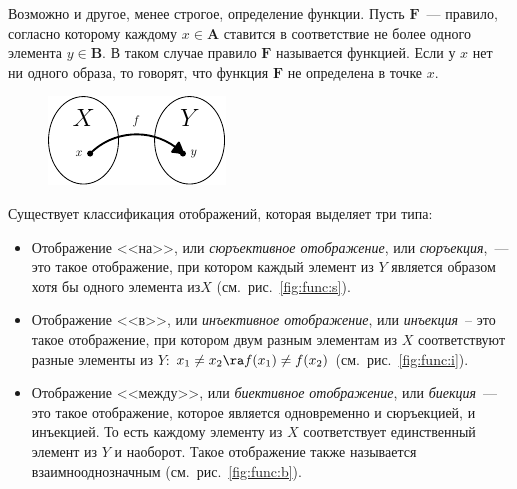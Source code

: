 Возможно и другое, менее строгое, определение функции. Пусть $\mathbf F$~--- правило, согласно которому каждому $x\in\mathbf A$ ставится в соответствие не более одного элемента $y\in\mathbf B$. В таком случае правило $\mathbf F$ называется функцией. Если у $x$ нет ни одного образа, то говорят, что функция $\mathbf F$ не определена в точке $x$.

\begin{figure}
	\vspace{-.33cm}
	\includegraphics{graph/mapping-def}
\end{figure}

Существует классификация отображений, которая выделяет три типа:

\begin{itemize}
	\item{}
		Отображение <<на>>, или \emph{сюръективное отображение}, или
		\emph{сюръекция},~--- это такое отображение, при котором каждый элемент из $Y$
		является образом хотя бы одного элемента из\newline $X$ (см.~рис.~\ref{fig:func:s}).
	\item{}
		Отображение <<в>>, или \emph{инъективное отображение}, или \emph{инъекция}~--
		это такое отображение, при котором двум разным элементам из $X$ соответствуют
		разные элементы из $Y$: $x_1\ne x_2 \ra f(x_1)\ne f(x_2)$ (см.~рис.~\ref{fig:func:i}).
	\item{}
		Отображение <<между>>, или \emph{биективное отображение}, или \emph{биекция}~---
		это такое отображение, которое является одновременно и сюръекцией, и инъекцией. То
		есть каждому элементу из $X$ соответствует единственный элемент из $Y$ и наоборот.
		Такое отображение также называется взаимнооднозначным (см.~рис.~\ref{fig:func:b}).
\end{itemize}

